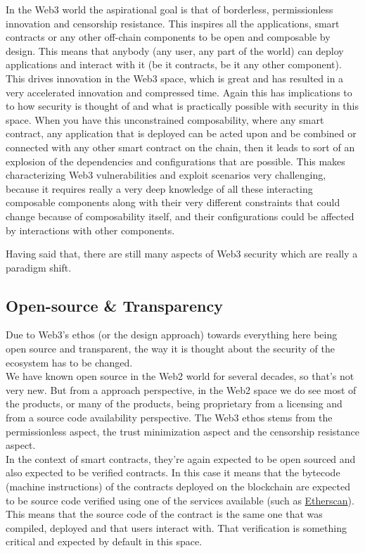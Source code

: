 In the Web3 world the aspirational goal is that of borderless, permissionless innovation and censorship resistance. This inspires all the applications, smart contracts or any other off-chain components to be open and composable by design. This means that anybody (any user, any part of the world) can deploy applications and interact with it (be it contracts, be it any other component). This drives innovation in the Web3 space, which is great and has resulted in a very accelerated innovation and compressed time. Again this has implications to to how security is thought of and what is practically possible with security in this space. When you have this unconstrained composability, where any smart contract, any application that is deployed can be acted upon and be combined or connected with any other smart contract on the chain, then it leads to sort of an explosion of the dependencies and configurations that are possible. This makes characterizing Web3 vulnerabilities and exploit scenarios very challenging, because it requires really a very deep knowledge of all these interacting composable components along with their very different constraints that could change because of composability itself, and their configurations could be affected by interactions with other components.

Having said that, there are still many aspects of Web3 security which are really a paradigm shift.

\subsection*{Open-source \& Transparency}

Due to Web3's ethos (or the design approach) towards everything here being open source and transparent, the way it is thought about the security of the ecosystem has to be changed.\\

We have known open source in the Web2 world for several decades, so that's not very new.
But from a approach perspective, in the Web2 space we do see most of the products, or many of the products, being proprietary from a licensing and from a source code availability perspective.
The Web3 ethos stems from the permissionless aspect, the trust minimization aspect and the censorship resistance aspect.\\

In the context of smart contracts, they're again expected to be open sourced and also expected to be verified contracts. In this case it means that the bytecode (machine instructions) of the contracts deployed on the blockchain are expected to be source code verified using one of the services available (such as \href{https://etherscan.io/}{Etherscan}).
This means that the source code of the contract is the same one that was compiled, deployed and that users interact with.
That verification is something critical and expected by default in this space.\\

